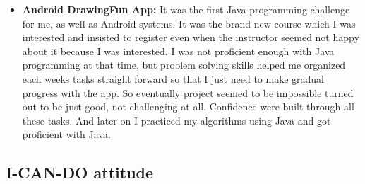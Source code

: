 \documentclass[9pt,b5paper]{article}
\begin{document}
\begin{itemize}
\item \textbf{Android DrawingFun App:} It was the first Java-programming challenge for me, as well as Android systems. It was the brand new course which I was interested and insisted to register even when the instructor seemed not happy about it because I was interested. I was not proficient enough with Java programming at that time, but problem solving skills helped me organized each weeks tasks straight forward so that I just need to make gradual progress with the app. So eventually project seemed to be impossible turned out to be just good, not challenging at all. Confidence were built through all these tasks. And later on I practiced my algorithms using Java and got proficient with Java.
\end{itemize}
\subsection{I-CAN-DO attitude}
\label{sec-9-2}
\end{document}
